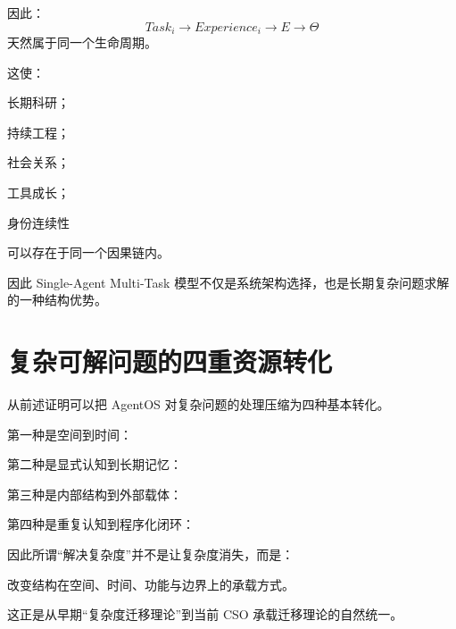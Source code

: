 因此：
\begin{equation}
Task_i
\rightarrow
Experience_i
\rightarrow
E
\rightarrow
\Theta
\end{equation}
天然属于同一个生命周期。

这使：

长期科研；

持续工程；

社会关系；

工具成长；

身份连续性

可以存在于同一个因果链内。

因此 Single-Agent Multi-Task 模型不仅是系统架构选择，也是长期复杂问题求解的一种结构优势。

\section{复杂可解问题的四重资源转化}

从前述证明可以把 AgentOS 对复杂问题的处理压缩为四种基本转化。

第一种是空间到时间：
\begin{statementbox}
\centering
{}
\end{statementbox}

第二种是显式认知到长期记忆：
\begin{statementbox}
\centering
{}
\end{statementbox}

第三种是内部结构到外部载体：
\begin{statementbox}
\centering
{}
\end{statementbox}

第四种是重复认知到程序化闭环：
\begin{statementbox}
\centering
{}
\end{statementbox}

因此所谓“解决复杂度”并不是让复杂度消失，而是：

\begin{statementbox}
改变结构在空间、时间、功能与边界上的承载方式。
\end{statementbox}

这正是从早期“复杂度迁移理论”到当前 CSO 承载迁移理论的自然统一。

